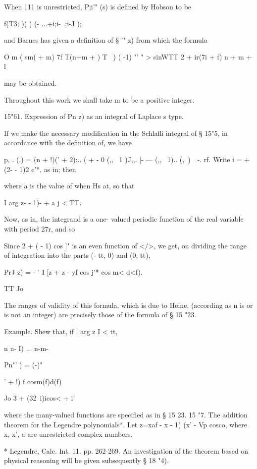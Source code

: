 {{{%
%

When 111 is unrestricted, P;i'" (s) is defined by Hobson to be

f(T3; )( ) (- ...+i;i- .;i-J );

and Barnes has given a definition of § '" z) from which the formula

O m ( sm( + m) 7f T(n+m + ) T \ ) ( -1) "' " > sinWTT 2 + ir(7i + f) n
+ m + l

may be obtained.

Throughout this work we shall take m to be a positive integer.

15"61. Expression of Pn z) as an integral of Laplace s type.

If we make the necessary modification in the Schlafli integral of §
15"5, in accordance with the definition of, we have

p, . (,) = (n + !)(' + 2);.. ( + - 0 (,, \ 1 )J,,. |- --- (,, \ 1)..
(, \,)\ \ -. rf. Write i = + (2- - 1)2 e'*, as in; then

where a is the value of when Hs at, so that

I arg z- - 1)- + a j < TT.

Now, as in, the integrand is a one- valued periodic function
of the real variable with period 27r, and so

Since 2 + ( - 1) cos ]" is an even function of </>, we get, on
dividing the range of integration into the parts (- tt, 0) and (0,
tt),

PrJ z) = - ' I [z + z - yf cos j'* cos m< d<f).

TT Jo

The ranges of validity of this formula, which is due to Heine,
(according as n is or is not an integer) are precisely those of the
formula of § 15 "23.

Example. Shew that, if | arg z I < tt,

n n- I) ... n-m-

Pn"' ) = (-)"

' + !) f cosm(f)d(f)

Jo 3 + (32\ i)icos< + i'

where the many-valued functions are specified as in § 15 23. 15 "7.
The addition theorem for the Legendre polynomials*. Let z=xaf - x - 1)
(x' - Vp cosco, where x, x', a are unrestricted complex numbers.

* Legendre, Calc. Int. 11. pp. 262-269. An investigation of the
theorem based on physical reasoning will be given subsequently § 18
"4).

}}}
